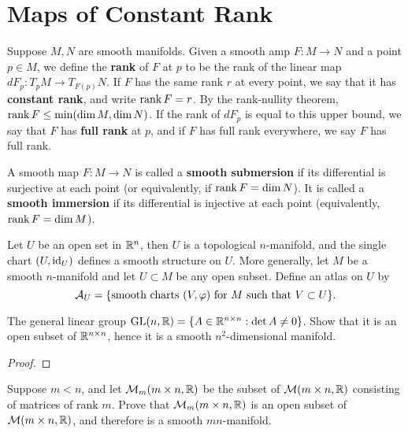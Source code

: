 \section{Maps of Constant Rank}
Suppose $M,N$ are smooth manifolds. Given a smooth amp $F:M \to N$ and a point $p \in M$, we define the \textbf{rank} of $F$ at $p$ to be the rank of the linear map $dF_p:T_pM \to T_{F(p)}N$. If $F$ has the same rank $r$ at every point, we say that it has \textbf{constant rank}, and write $\rank F = r$. 
By the rank-nullity theorem, $\rank F \leq \min(\dim M, \dim N)$. If the rank of $dF_p$ is equal to this upper bound, we say that $F$ has \textbf{full rank} at $p$, and if $F$ has full rank everywhere, we say $F$ has full rank. 
\begin{definition}
    A smooth map $F:M \to N$ is called a \textbf{smooth submersion} if its differential is surjective at each point (or equivalently, if $\rank F = \dim N$). It is called a \textbf{smooth immersion} if its differential is injective at each point (equivalently, $\rank F = \dim M$). 
\end{definition}

\begin{example}
    Let $U$ be an open set in $\mathbb{R}^n$, then $U$ is a topological $n$-manifold, and the single chart $(U,\mathrm{id}_U)$ defines a smooth structure on $U$. 
    More generally, let $M$ be a smooth $n$-manifold and let $U \subset M$ be any open subset. Define an atlas on $U$ by 
    $$\mathcal{A}_U = \{\text{smooth charts }(V,\varphi)\text{ for }M\text{ such that }V \subset U\}.$$
    
    
\end{example}
\begin{example}
    The general linear group $\mathrm{GL}(n,\mathbb{R})=\{A \in \mathbb{R}^{n \times n}: \det A \neq 0 \}$. Show that it is an open subset of $\mathbb{R}^{n \times n}$, hence it is a smooth $n^2$-dimensional manifold.  
\end{example}
\begin{proof}
    
\end{proof}
\begin{example}
    Suppose $m<n$, and let $\mathcal{M}_m(m \times n, \mathbb{R})$ be the subset of $\mathcal{M}(m \times n, \mathbb{R})$ consisting of matrices of rank $m$. Prove that $\mathcal{M}_m(m \times n, \mathbb{R})$ is an open subset of $\mathcal{M}(m \times n, \mathbb{R})$, and therefore is a smooth $mn$-manifold. 
\end{example}

